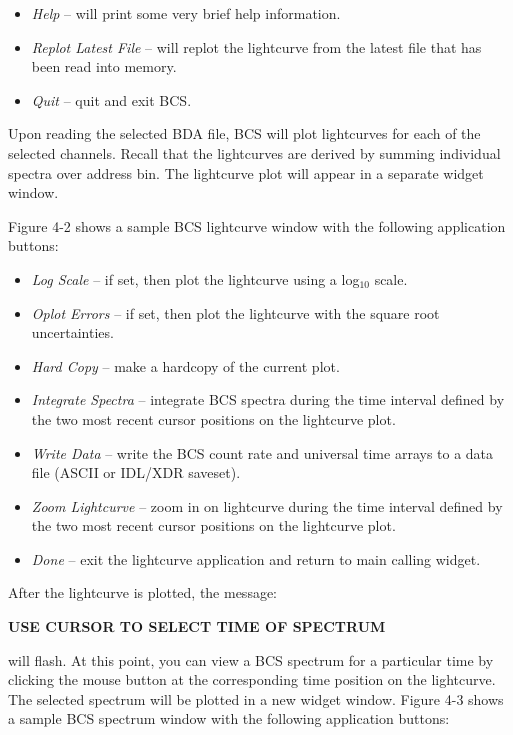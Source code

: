 {{{\begin{itemize}
\item{\it Help} -- will print some very brief help information.

\item{\it Replot Latest File} -- will replot the lightcurve from
the latest file that has been read into memory.

\item{\it Quit} -- quit and exit BCS.

\end{itemize}
Upon reading the selected BDA file, BCS will plot
lightcurves for each of the selected channels. Recall that the 
lightcurves are derived by summing individual spectra over address bin.
The lightcurve plot will appear in a separate widget window.

Figure 4-2 shows a sample BCS lightcurve window with the following application
buttons:
\begin{itemize}

\item{\it Log Scale} -- if set, then plot the lightcurve using a 
log$_{10}$ scale. \

\item{\it Oplot Errors} -- if set, then plot the lightcurve with the square root
uncertainties.

\item{\it Hard Copy} -- make a hardcopy of the current plot.

\item{\it Integrate Spectra} -- integrate BCS 
spectra during the time interval defined by the two 
most recent cursor positions on the lightcurve plot.

\item{\it Write Data} -- write the BCS count rate and universal time arrays
to a data file (ASCII or IDL/XDR saveset).

\item{\it Zoom Lightcurve} -- zoom in on lightcurve 
during the time interval defined by the two 
most recent cursor positions on the lightcurve plot.

\item{\it Done} -- exit the lightcurve application and return to main calling widget.
              
\end{itemize}
After the lightcurve is plotted, the message:
\newline
\newline
\centerline{\bf USE CURSOR TO SELECT TIME OF SPECTRUM}
\newline
\newline
will flash. At this point, you can view a BCS spectrum for a 
particular time by clicking the mouse button at the corresponding time position
on the lightcurve. The selected spectrum will be plotted
in a new widget window.
Figure 4-3 shows a sample BCS spectrum window with 
the following application buttons:
\begin{itemize}
                              

\end{itemize}}}}

